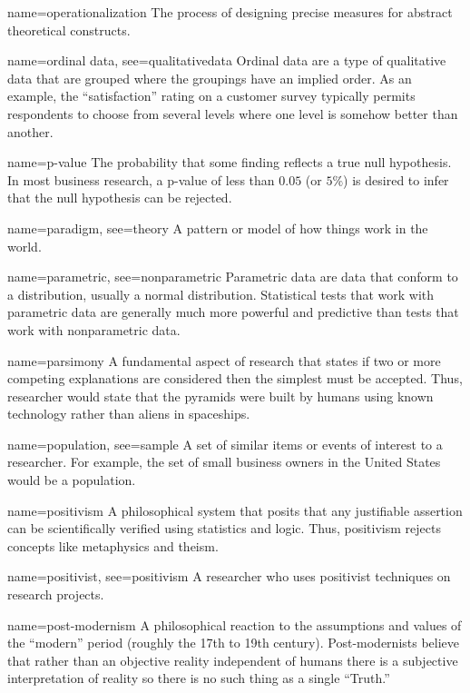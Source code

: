 {name={operationalization}}
{%
	 The process of designing precise measures for abstract theoretical constructs. 
}

{name={ordinal data},
	see={qualitativedata}}
{%
	Ordinal data are a type of qualitative data that are grouped where the groupings have an implied order. As an example, the ``satisfaction'' rating on a customer survey typically permits respondents to choose from several levels where one level is somehow better than another.
}

{name={p-value}}
{%
	The probability that some finding reflects a true null hypothesis. In most business research, a p-value of less than $ 0.05 $ (or $ 5\% $) is desired to infer that the null hypothesis can be rejected.
}

{name={paradigm},
	see={theory}}
{%
	A pattern or model of how things work in the world. 
}

{name={parametric},
	see={nonparametric}}
{%
	Parametric data are data that conform to a distribution, usually a normal distribution. Statistical tests that work with parametric data are generally much more powerful and predictive than tests that work with nonparametric data.
}

	{name={parsimony}}
	{%
		A fundamental aspect of research that states if two or more competing explanations are considered then the simplest must be accepted. Thus, researcher would state that the pyramids were built by humans using known technology rather than aliens in spaceships.
	}

{name={population},
 see={sample}}
{%
	A set of similar items or events of interest to a researcher. For example, the set of small business owners in the United States would be a population.
}

{name={positivism}}
{%
	A philosophical system that posits that any justifiable assertion can be scientifically verified using statistics and logic. Thus, positivism rejects concepts like metaphysics and theism.
}

{name={positivist},
 see={positivism}}
{%
	A researcher who uses positivist techniques on research projects.
}

{name={post-modernism}}
{%
	A philosophical reaction to the assumptions and values of the ``modern'' period (roughly the 17th to 19th century). Post-modernists believe that rather than an objective reality independent of humans there is a subjective interpretation of reality so there is no such thing as a single ``Truth.''
}

